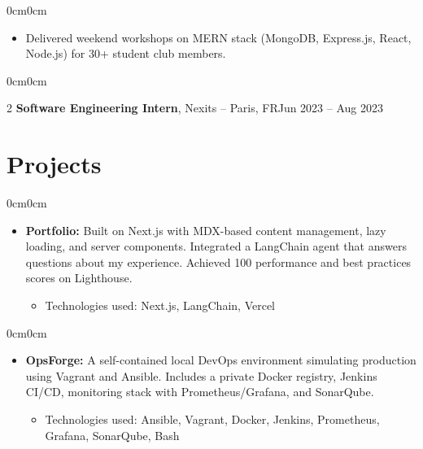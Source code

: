 \documentclass[10pt, a4paper]{article}
\newenvironment{highlights}{\begin{itemize}[topsep=0.10 cm, parsep=0.10 cm, partopsep=0pt, itemsep=0pt, leftmargin=0 cm + 10pt]}{\end{itemize}}
\newenvironment{highlightsforbulletentries}{\begin{itemize}[topsep=0.10 cm, parsep=0.10 cm, partopsep=0pt, itemsep=0pt, leftmargin=10pt]}{\end{itemize}}
\newenvironment{onecolentry}{\begin{adjustwidth}{0cm}{0cm}}{\end{adjustwidth}}
\newenvironment{twocolentry}[2][]{\onecolentry \def\secondColumn{#2} \setcolumnwidth{\fill, 4.5 cm} \begin{paracol}{2}}{\switchcolumn \raggedleft \secondColumn \end{paracol} \end{onecolentry}}
\begin{document}
\vspace{0.10 cm}
\begin{onecolentry}
  \begin{highlights}
  \item Delivered weekend workshops on MERN stack (MongoDB, Express.js, React, Node.js) for 30+ student club members.
  \end{highlights}
\end{onecolentry}

\vspace{0.2 cm}
\begin{twocolentry}{Jun 2023 -- Aug 2023}
\textbf{Software Engineering Intern}, Nexits -- Paris, FR\end{twocolentry}

\section{Projects}

\vspace{0.2 cm}
\begin{onecolentry}
  \begin{highlights}
  \item \textbf{Portfolio:} Built on Next.js with MDX-based content management, lazy loading, and server components. Integrated a LangChain agent that answers questions about my experience. Achieved 100 performance and best practices scores on Lighthouse.
    \begin{highlightsforbulletentries}
    \item Technologies used: Next.js, LangChain, Vercel
    \end{highlightsforbulletentries}
  \end{highlights}
\end{onecolentry}

\vspace{0.2 cm}
\begin{onecolentry}
  \begin{highlights}
  \item \textbf{OpsForge:} A self-contained local DevOps environment simulating production using Vagrant and Ansible. Includes a private Docker registry, Jenkins CI/CD, monitoring stack with Prometheus/Grafana, and SonarQube.
    \begin{highlightsforbulletentries}
    \item Technologies used: Ansible, Vagrant, Docker, Jenkins, Prometheus, Grafana, SonarQube, Bash
    \end{highlightsforbulletentries}
  \end{highlights}
\end{onecolentry}
\end{document}
